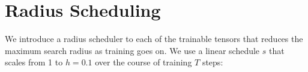     

\section{Radius Scheduling} \label{section:schedule}
We introduce a radius scheduler to each of the trainable 
tensors that reduces the maximum search radius 
as training goes on. We use a linear schedule $s$ that scales 
from 1 to $h = 0.1$ over the course of training $T$ steps:
